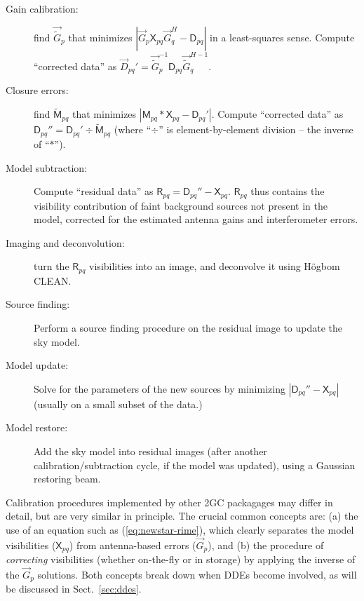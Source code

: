 \documentclass[]{aa}
\newcommand{\herm}{H}
\newcommand{\jones}[2]{\vec {#1}_{#2}}
\newcommand{\jonesinv}[2]{\vec {#1}^{-1}_{#2}}
\newcommand{\jonesT}[2]{\vec {#1}^{\herm}_{#2}}
\newcommand{\jonesTinv}[2]{\vec {#1}^{{\herm}-1}_{#2}}
\newcommand{\coh}[2]{\mathsf{{#1}}_{{#2}}}
\begin{document}
\begin{description}

\item[Gain calibration:] find $\jones{\tilde{G}}{p}$ that minimizes $|\jones{G}{p}\coh{X}{pq}\jonesT{G}{q} - \coh{D}{pq}|$ in a least-squares sense. Compute ``corrected data'' as $\jones{D}{pq}' = \jonesinv{\tilde{G}}{p} \coh{D}{pq} \jonesTinv{\tilde{G}}{q}.$

\item[Closure errors:] find $\coh{\tilde{M}}{pq}$ that minimizes $|\coh{M}{pq} \ast \coh{X}{pq} - \coh{D}{pq}'|$.
Compute ``corrected data'' as $\coh{D}{pq}'' = \coh{D}{pq}' \div \coh{\tilde{M}}{pq}$ (where ``$\div$'' is element-by-element division -- the inverse of ``$\ast$'').

\item[Model subtraction:] Compute ``residual data'' as $\coh{R}{pq} = \coh{D}{pq}'' - \coh{X}{pq}$. $\coh{R}{pq}$ thus contains the visibility contribution of faint background sources not present in the model, corrected for the estimated antenna gains and interferometer errors.

\item[Imaging and deconvolution:] turn the $\coh{R}{pq}$ visibilities into an image, and deconvolve it using H\"ogbom CLEAN. 

\item[Source finding:] Perform a source finding procedure on the residual image to update the sky model.

\item[Model update:] Solve for the parameters of the new sources by minimizing $|\coh{D}{pq}'' - \coh{X}{pq}|$ (usually on a small subset of the data.)

\item[Model restore:] Add the sky model into residual images (after another calibration/subtraction cycle, if the model was updated), using a Gaussian restoring beam.

\end{description}

Calibration procedures implemented by other 2GC packagages may differ in detail, but are very similar in principle. The crucial common concepts are: (a) the use of an equation such as (\ref{eq:newstar-rime}), which clearly separates the model visibilities ($\coh{X}{pq}$) from antenna-based errors ($\jones{G}{p}$), and (b) the procedure of \emph{correcting} visibilities (whether on-the-fly or in storage) by applying the inverse of the $\jones{G}{p}$ solutions. Both concepts break down when DDEs become involved, as will be discussed in Sect.~\ref{sec:ddes}.
\end{document}
